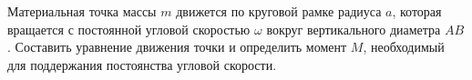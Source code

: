 Материальная точка массы $m$ движется по круговой рамке радиуса $a$, которая вращается с постоянной угловой скоростью $\omega$ вокруг вертикального диаметра $AB$. Составить уравнение движения точки и определить момент $M$, необходимый для поддержания постоянства угловой скорости.
